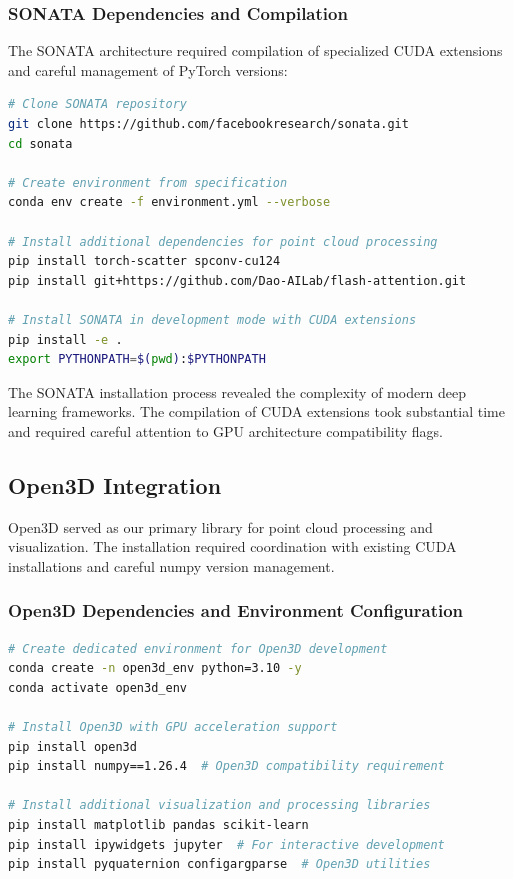 \documentclass[12pt,a4paper]{report}
\begin{document}
\subsubsection{SONATA Dependencies and Compilation}

The SONATA architecture required compilation of specialized CUDA extensions and careful management of PyTorch versions:

\begin{lstlisting}[caption=SONATA Environment Dependencies, label=lst:sonata_deps, language=bash]
# Clone SONATA repository
git clone https://github.com/facebookresearch/sonata.git
cd sonata

# Create environment from specification
conda env create -f environment.yml --verbose

# Install additional dependencies for point cloud processing
pip install torch-scatter spconv-cu124
pip install git+https://github.com/Dao-AILab/flash-attention.git

# Install SONATA in development mode with CUDA extensions
pip install -e .
export PYTHONPATH=$(pwd):$PYTHONPATH
\end{lstlisting}

The SONATA installation process revealed the complexity of modern deep learning frameworks. The compilation of CUDA extensions took substantial time and required careful attention to GPU architecture compatibility flags.

\subsection{Open3D Integration}

Open3D served as our primary library for point cloud processing and visualization. The installation required coordination with existing CUDA installations and careful numpy version management.

\subsubsection{Open3D Dependencies and Environment Configuration}

\begin{lstlisting}[caption=Open3D Installation with CUDA Support, label=lst:open3d_setup, language=bash]
# Create dedicated environment for Open3D development
conda create -n open3d_env python=3.10 -y
conda activate open3d_env

# Install Open3D with GPU acceleration support
pip install open3d
pip install numpy==1.26.4  # Open3D compatibility requirement

# Install additional visualization and processing libraries
pip install matplotlib pandas scikit-learn
pip install ipywidgets jupyter  # For interactive development
pip install pyquaternion configargparse  # Open3D utilities
\end{lstlisting}
\end{document}
